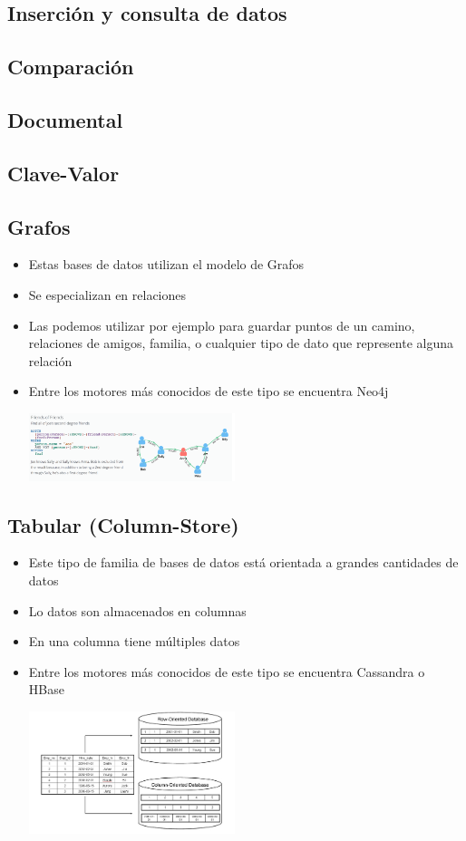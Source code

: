 \documentclass[%
 reprint,
 amsmath,amssymb,
 aps,
]{revtex4-1}
\begin{document}
\subsection{Inserción y consulta de datos}
\subsection{Comparación}
\subsection{Documental}
\subsection{Clave-Valor}
\subsection{Grafos}
\begin{itemize}
		\item Estas bases de datos utilizan el modelo de Grafos
		\item Se especializan en relaciones
		\item Las podemos utilizar por ejemplo para guardar puntos de un camino, relaciones de amigos, familia, o cualquier tipo de  dato que represente alguna relación
                     \item Entre los motores más conocidos de este tipo se encuentra Neo4j
                     \begin{center}
		\includegraphics[width=6cm]{./Imagenes/4}
		\end{center}	
	          \end{itemize}
\subsection{Tabular (Column-Store)}
\begin{itemize}
		\item Este tipo de familia de bases de datos está orientada a grandes cantidades de datos
		\item Lo datos son almacenados en columnas
		\item En una columna tiene múltiples datos
                     \item Entre los motores más conocidos de este tipo se encuentra Cassandra o HBase 
                     \begin{center}
		\includegraphics[width=6cm]{./Imagenes/5}
		\end{center}	
	          \end{itemize} 
\end{document}
